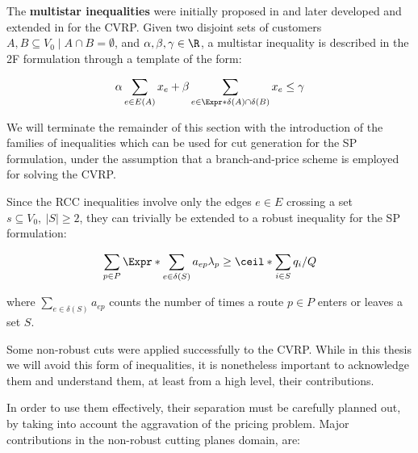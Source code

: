 The \textbf{multistar inequalities} were initially proposed in \textcite{araque1990, gouveia1995}
and later developed and extended in \textcite{letchford2002} for the CVRP.
Given two disjoint sets of customers $A, B \subseteq V_0 \mid A \cap B = \emptyset$,
and $\alpha, \beta, \gamma \in \R$,
a multistar inequality is described in the 2F formulation through a
template of the form:

\begin{equation}
	\alpha \sum_{e \in E(A)} x_e + \beta \sum_{e \in \Expr*{\delta(A) \cap \delta(B)}} x_e \le \gamma
\end{equation}


\medskip


We will terminate the remainder of this section with the introduction
of the families of inequalities which can be used for cut generation
for the SP formulation, under the assumption that a branch-and-price scheme is employed
for solving the CVRP.

Since the RCC inequalities involve only the edges $e \in E$ crossing a set $s \subseteq V_0,\ |S| \ge 2$,
they can trivially be extended to a robust inequality for the SP formulation:

\begin{equation}
    \sum_{p \in P} \Expr*{\sum_{e \in \delta(S)} a_{ep}} \lambda_p \ge \ceil*{\sum_{i \in S} q_i / Q}
\end{equation}


where $\sum_{e \in \delta(S)} a_{ep}$ counts the number of times a route $p \in P$
enters or leaves a set $S$.


\medskip

Some non-robust cuts were applied successfully to the CVRP.
While in this thesis we will avoid this form of inequalities,
it is nonetheless important to acknowledge them and understand
them, at least from a high level, their contributions.

In order to use them effectively, their separation must be carefully
planned out, by taking into account the aggravation of the pricing problem.
Major contributions in the non-robust cutting planes domain, are:

